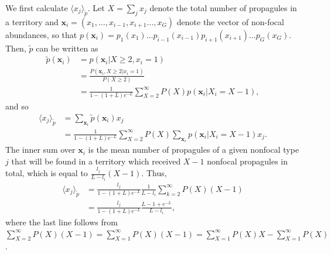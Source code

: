 \documentclass[11pt]{article}
\begin{document}
We first calculate $\langle x_j \rangle_{\tilde{p}}$. Let $X=\sum_j x_j$ denote the total number of propagules in a territory and ${\mathbf x_i}=(x_1,\ldots,x_{i-1},x_{i+1}\ldots,x_G)$ denote the vector of non-focal abundances, so that $p({\mathbf x_i})=p_1(x_1)\ldots p_{i-1}(x_{i-1})p_{i+1}(x_{i+1})\ldots p_G(x_G)$. Then, $\tilde{p}$ can be written as
\begin{align}
\tilde{p}({\mathbf x_i})&=p({\mathbf x_i}|X\geq 2,x_i=1)\nonumber\\
&=\frac{P({\mathbf x_i},X\geq 2|x_i=1)}{P(X\geq 2)}\nonumber\\
&=\frac{1}{1-(1+L)e^{-L}}\sum_{X=2}^{\infty} P(X) p({\mathbf x_i}|X_i=X-1),
\end{align}
and so
\begin{align}
\langle x_j \rangle_{\tilde{p}}&=\sum_{\mathbf x_i} \tilde{p}({\mathbf x_i})x_j\nonumber\\
&=\frac{1}{1-(1+L)e^{-L}}\sum_{X=2}^{\infty} P(X) \sum_{\mathbf x_i} p({\mathbf x_i}|X_i=X-1)x_j.
\label{eq:raremonster1}
\end{align}
The inner sum over ${\mathbf x_i}$ is the mean number of propagules of a given nonfocal type $j$ that will be found in a territory which received $X-1$ nonfocal propagules in total, which is equal to $\frac{l_j}{L-l_i}(X-1)$. Thus, 
\begin{align}
\langle x_j \rangle_{\tilde{p}}&=\frac{l_j}{1-(1+L)e^{-L}}\frac{1}{L-l_i}\sum_{k=2}^{\infty} P(X) (X-1)\nonumber\\
&=\frac{l_j}{1-(1+L)e^{-L}}\frac{L-1+e^{-L}}{L-l_i},
\label{eq:meanxjrare}
\end{align}
where the last line follows from $\sum_{X=2}^{\infty} P(X)(X-1)=\sum_{X=1}^{\infty} P(X)(X-1)=\sum_{X=1}^{\infty} P(X)X-\sum_{X=1}^{\infty}P(X)$.
\end{document}
